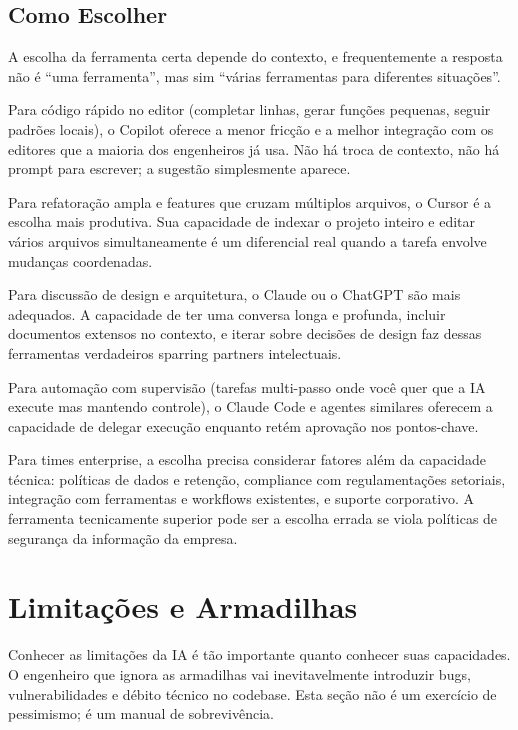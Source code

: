 \subsection{Como Escolher}

A escolha da ferramenta certa depende do contexto, e frequentemente a resposta não é
``uma ferramenta'', mas sim ``várias ferramentas para diferentes situações''.

Para código rápido no editor (completar linhas, gerar funções pequenas, seguir
padrões locais), o Copilot oferece a menor fricção e a melhor integração com os
editores que a maioria dos engenheiros já usa. Não há troca de contexto, não há prompt
para escrever; a sugestão simplesmente aparece.

Para refatoração ampla e features que cruzam múltiplos arquivos, o Cursor é a escolha
mais produtiva. Sua capacidade de indexar o projeto inteiro e editar vários arquivos
simultaneamente é um diferencial real quando a tarefa envolve mudanças coordenadas.

Para discussão de design e arquitetura, o Claude ou o ChatGPT são mais adequados. A
capacidade de ter uma conversa longa e profunda, incluir documentos extensos no
contexto, e iterar sobre decisões de design faz dessas ferramentas verdadeiros
sparring partners intelectuais.

Para automação com supervisão (tarefas multi-passo onde você quer que a IA execute
mas mantendo controle), o Claude Code e agentes similares oferecem a capacidade de
delegar execução enquanto retém aprovação nos pontos-chave.

Para times enterprise, a escolha precisa considerar fatores além da capacidade técnica:
políticas de dados e retenção, compliance com regulamentações setoriais, integração com
ferramentas e workflows existentes, e suporte corporativo. A ferramenta tecnicamente
superior pode ser a escolha errada se viola políticas de segurança da informação da
empresa.

\section{Limitações e Armadilhas}

Conhecer as limitações da IA é tão importante quanto conhecer suas
capacidades. O engenheiro que ignora as armadilhas vai inevitavelmente
introduzir bugs, vulnerabilidades e débito técnico no codebase. Esta seção
não é um exercício de pessimismo; é um manual de sobrevivência.


